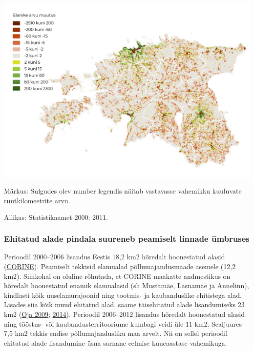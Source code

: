 \documentclass[estonian,]{article}
\begin{document}
\begin{center}\includegraphics[width=0.8\linewidth]{figures/1-chapter/fig111} \end{center}

\begin{figure-comment}
{Märkus:} Sulgudes olev number legendis näitab vastavasse vahemikku
kuuluvate ruutkilomeetrite arvu.
\end{figure-comment}

\begin{imgsource}
{Allikas:} Statistikaamet 2000; 2011.
\end{imgsource}

\hypertarget{ehitatud-alade-pindala-suureneb-peamiselt-linnade-uxfcmbruses}{%
\subsubsection*{Ehitatud alade pindala suureneb peamiselt linnade ümbruses}\label{ehitatud-alade-pindala-suureneb-peamiselt-linnade-uxfcmbruses}}

Perioodil 2000--2006 lisandus Eestis 18,2 km2 hõredalt hoonestatud alasid (\protect\hyperlink{CORINE}{CORINE}). Peamiselt tekkisid elamualad põllumajandusmaade asemele (12,2 km2). Siinkohal on oluline rõhutada, et CORINE maakatte andmestikus on hõredalt hoonestatud enamik elamualasid (sh Mustamäe, Lasnamäe ja Annelinn), kindlasti kõik uuselamurajoonid ning tootmis- ja kaubanduslike ehitistega alad. Lisades siia kõik muud ehitatud alad, saame täisehitatud alade lisandumiseks 23 km2 (\protect\hyperlink{Oja2009}{Oja 2009}; \protect\hyperlink{Oja2014}{2014}). Perioodil 2006--2012 lisandus hõredalt hoonestatud alasid ning tööstus- või kaubandusterritooriume kumbagi veidi üle 11 km2. Sealjuures 7,5 km2 tekkis endise põllumajandusliku maa arvelt. Nii on sellel perioodil ehitatud alade lisandumine üsna sarnane eelmise kuueaastase vahemikuga.
\end{document}
